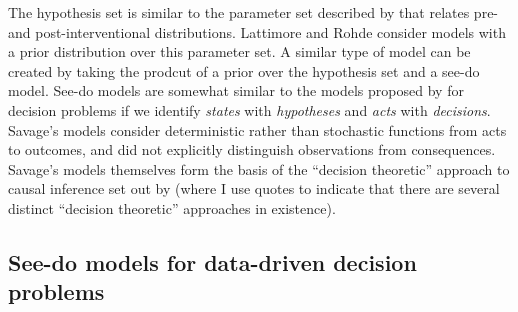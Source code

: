 The hypothesis set is similar to the parameter set described by \citet{lattimore_replacing_2019} that relates pre- and post-interventional distributions. Lattimore and Rohde consider models with a prior distribution over this parameter set. A similar type of model can be created by taking the prodcut of a prior over the hypothesis set and a see-do model. See-do models are somewhat similar to the models proposed by \citet{savage_foundations_1954} for decision problems if we identify \emph{states} with \emph{hypotheses} and \emph{acts} with \emph{decisions}. Savage's models consider deterministic rather than stochastic functions from acts to outcomes, and did not explicitly distinguish observations from consequences. Savage's models themselves form the basis of the ``decision theoretic'' approach to causal inference set out by \citet{heckerman_decision-theoretic_1995} (where I use quotes to indicate that there are several distinct ``decision theoretic'' approaches in existence).

\subsection{See-do models for data-driven decision problems}\label{ssec:data_driven_decision}

